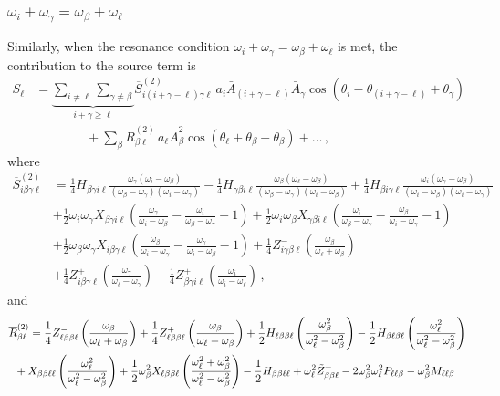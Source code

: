 \documentclass[letterpaper,11pt]{article}
\newcommand{\oi}{\omega_i}
\newcommand{\ol}{\omega_\ell}
\newcommand{\obet}{\omega_{\beta}}
\newcommand{\ogam}{\omega_\gamma}
\begin{document}
\subsubsection{$\oi + \ogam = \obet + \ol$}
\label{ssec: intpluschi2}

Similarly, when the resonance condition $\oi + \ogam = \obet + \ol$ is met, the contribution to the source term is
\begin{align}
\label{intpluschi2 source}
S_\ell &= \underbrace{\sum_{i \neq \ell} \sum_{\gamma \neq \beta}}_{i + \gamma \geq \ell} \overline{S}^{(2)}_{i (i + \gamma - \ell) \gamma \ell} \, a_i \bar A_{(i + \gamma - \ell)} \bar A_\gamma \cos \left( \theta_i - \theta_{(i + \gamma - \ell)}  + \theta_\gamma \right) \nonumber \\
%
& \qquad \qquad + \sum_\beta \overline{R}^{(2)}_{\beta\ell} \, a_\ell \bar A_\beta^2 \cos \left( \theta_\ell + \theta_\beta - \theta_\beta \right) + \ldots \, ,
\end{align}
where
\begin{align}
\overline{S}^{(2)}_{i\beta\gamma\ell} &= \frac{1}{4} H_{\beta\gamma i\ell} \frac{\ogam (\oi - \obet)}{(\obet - \ogam)(\oi - \ogam)} - \frac{1}{4} H_{\gamma\beta i \ell} \frac{\obet(\ol - \obet)}{(\obet - \ogam)(\oi - \obet)} + \frac{1}{4} H_{\beta i \gamma\ell} \frac{\oi (\ogam - \obet)}{(\oi - \obet)(\oi - \ogam)} \nonumber \\
%
& + \frac{1}{2} \oi \ogam X_{\beta\gamma i \ell} \left( \frac{\ogam}{\oi - \obet} - \frac{\oi}{\obet - \ogam} + 1 \right) + \frac{1}{2} \oi \obet X_{\gamma\beta i \ell} \left( \frac{\oi}{\obet - \ogam} - \frac{\obet}{\oi - \ogam} - 1 \right) \nonumber \\
%
& + \frac{1}{2} \obet \ogam X_{i\beta\gamma\ell} \left( \frac{\obet}{\oi - \ogam} - \frac{\ogam}{\oi - \obet} - 1 \right)  + \frac{1}{4} Z^-_{i\gamma\beta\ell} \left( \frac{\obet}{\ol + \obet}\right)  \nonumber \\
%
&
+ \frac{1}{4} Z^+_{i\beta\gamma\ell} \left( \frac{\ogam}{\ol - \ogam}\right) - \frac{1}{4}Z^+_{\beta\gamma i \ell} \left( \frac{\oi}{\oi - \ol} \right) \, ,
\end{align}
and
\begin{align}
\overline{R}^{(2)}_{\beta\ell} &= \frac{1}{4} Z^-_{\ell\beta\beta\ell} \left( \frac{\obet}{\ol + \obet} \right) + \frac{1}{4} Z^+_{\ell\beta\beta\ell} \left( \frac{\obet}{\ol - \obet} \right) + \frac{1}{2} H_{\ell\beta\beta\ell} \left( \frac{\obet^2}{\ol^2 - \obet^2} \right) - \frac{1}{2} H_{\beta\ell\beta\ell} \left( \frac{\ol^2}{\ol^2 - \obet^2} \right) \nonumber \\
%
& \!\!\!\!\!\!\!\! + X_{\beta\beta\ell\ell} \left( \frac{\ol^2}{\ol^2 - \obet^2} \right) + \frac{1}{2} \obet^2 X_{\ell\beta\beta\ell} \left( \frac{\ol^2 + \obet^2}{\ol^2 - \obet^2} \right) - \frac{1}{2} H_{\beta\beta\ell\ell} +  \ol^2 \tilde{Z}^+_{\beta\beta\ell} - 2 \obet^2 \ol^2 P_{\ell\ell\beta} - \obet^2 M_{\ell\ell\beta} \vspace{-0.3in}
\end{align}
\end{document}
